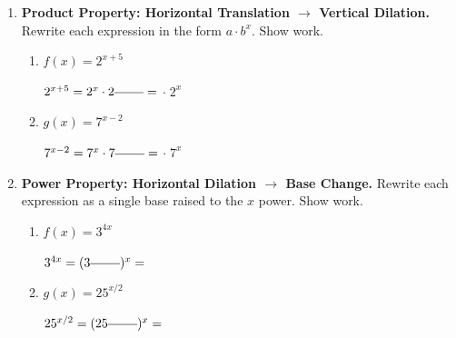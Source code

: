 \documentclass[10pt]{article}
\begin{document}

\vspace{0.12in}

\begin{enumerate}[itemsep=18pt]

\item \textbf{Product Property: Horizontal Translation $\to$ Vertical Dilation.}
      Rewrite each expression in the form $a \cdot b^x$. Show work.

      \begin{enumerate}[label=(\alph*), itemsep=10pt]
        \item $f(x) = 2^{x+5}$

              \vspace{0.06in}
              $2^{x+5} = 2^x \cdot 2^{\blank{0.8cm}} = $ \smash{\gradedblank[id=hw1a, type=short, points=1, answer={32}]{2cm}{13pt}} $\cdot\; 2^x$

        \item $g(x) = 7^{x-2}$

              \vspace{0.06in}
              $7^{x-2} = 7^x \cdot 7^{\blank{0.8cm}} = $ \smash{\gradedblank[id=hw1b, type=short, points=1, answer={\frac{1}{49}}, display={$1/49$}]{3.5cm}{13pt}} $\cdot\; 7^x$
      \end{enumerate}

\item \textbf{Power Property: Horizontal Dilation $\to$ Base Change.}
      Rewrite each expression as a single base raised to the $x$ power. Show work.

      \begin{enumerate}[label=(\alph*), itemsep=10pt]
        \item $f(x) = 3^{4x}$

              \vspace{0.06in}
              $3^{4x} = (3^{\blank{0.8cm}})^x = $ \smash{\gradedblank[id=hw2a, type=short, points=1, answer={81^x}]{3cm}{13pt}}

        \item $g(x) = 25^{x/2}$

              \vspace{0.06in}
              $25^{x/2} = (25^{\blank{0.8cm}})^x = $ \smash{\gradedblank[id=hw2b, type=short, points=1, answer={5^x}]{3cm}{13pt}}
      \end{enumerate}


\end{enumerate}
\end{document}
